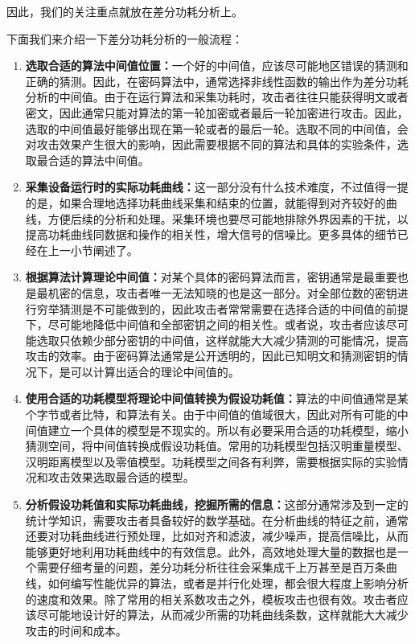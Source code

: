 因此，我们的关注重点就放在差分功耗分析上。

\vspace*{0.5\baselineskip}

下面我们来介绍一下差分功耗分析的一般流程：\cite{paa_cn}

\begin{enumerate}
\item \textbf{选取合适的算法中间值位置：}一个好的中间值，应该尽可能地区错误的猜测和正确的猜测。因此，在密码算法中，通常选择非线性函数的输出作为差分功耗分析的中间值。由于在运行算法和采集功耗时，攻击者往往只能获得明文或者密文，因此通常只能对算法的第一轮加密或者最后一轮加密进行攻击。因此，选取的中间值最好能够出现在第一轮或者的最后一轮。选取不同的中间值，会对攻击效果产生很大的影响，因此需要根据不同的算法和具体的实验条件，选取最合适的算法中间值。
\item \textbf{采集设备运行时的实际功耗曲线：}这一部分没有什么技术难度，不过值得一提的是，如果合理地选择功耗曲线采集和结束的位置，就能得到对齐较好的曲线，方便后续的分析和处理。采集环境也要尽可能地排除外界因素的干扰，以提高功耗曲线同数据和操作的相关性，增大信号的信噪比。更多具体的细节已经在上一小节阐述了。
\item \textbf{根据算法计算理论中间值：}对某个具体的密码算法而言，密钥通常是最重要也是最机密的信息，攻击者唯一无法知晓的也是这一部分。对全部位数的密钥进行穷举猜测是不可能做到的，因此攻击者常常需要在选择合适的中间值的前提下，尽可能地降低中间值和全部密钥之间的相关性。或者说，攻击者应该尽可能选取只依赖少部分密钥的中间值，这样就能大大减少猜测的可能情况，提高攻击的效率。由于密码算法通常是公开透明的，因此已知明文和猜测密钥的情况下，是可以计算出适合的理论中间值的。
\item \textbf{使用合适的功耗模型将理论中间值转换为假设功耗值：}算法的中间值通常是某个字节或者比特，和算法有关。由于中间值的值域很大，因此对所有可能的中间值建立一个具体的模型是不现实的。所以有必要采用合适的功耗模型，缩小猜测空间，将中间值转换成假设功耗值。常用的功耗模型包括汉明重量模型、汉明距离模型以及零值模型。功耗模型之间各有利弊，需要根据实际的实验情况和攻击效果选取最合适的模型。
\item \textbf{分析假设功耗值和实际功耗曲线，挖掘所需的信息：}这部分通常涉及到一定的统计学知识，需要攻击者具备较好的数学基础。在分析曲线的特征之前，通常还要对功耗曲线进行预处理，比如对齐和滤波，减少噪声，提高信噪比，从而能够更好地利用功耗曲线中的有效信息。此外，高效地处理大量的数据也是一个需要仔细考量的问题，差分功耗分析往往会采集成千上万甚至是百万条曲线，如何编写性能优异的算法，或者是并行化处理，都会很大程度上影响分析的速度和效果。除了常用的相关系数攻击之外，模板攻击也很有效。攻击者应该尽可能地设计好的算法，从而减少所需的功耗曲线条数，这样就能大大减少攻击的时间和成本。
\end{enumerate}

